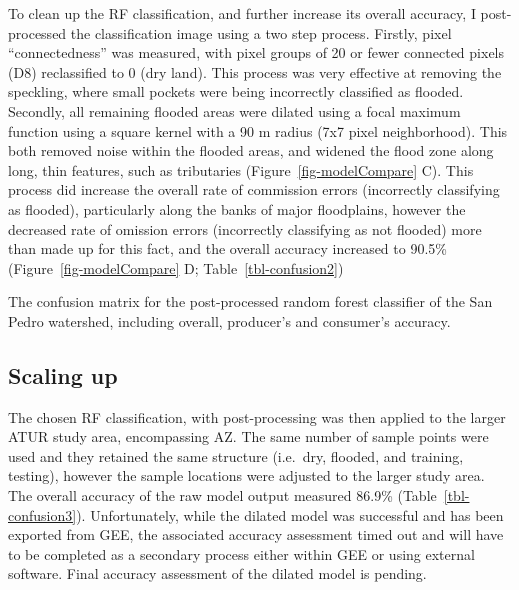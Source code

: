 \documentclass[
]{agujournal2019}
\begin{document}
To clean up the RF classification, and further increase its overall
accuracy, I post-processed the classification image using a two step
process. Firstly, pixel ``connectedness'' was measured, with pixel
groups of 20 or fewer connected pixels (D8) reclassified to 0 (dry
land). This process was very effective at removing the speckling, where
small pockets were being incorrectly classified as flooded. Secondly,
all remaining flooded areas were dilated using a focal maximum function
using a square kernel with a 90 m radius (7x7 pixel neighborhood). This
both removed noise within the flooded areas, and widened the flood zone
along long, thin features, such as tributaries
(Figure~\ref{fig-modelCompare} C). This process did increase the overall
rate of commission errors (incorrectly classifying as flooded),
particularly along the banks of major floodplains, however the decreased
rate of omission errors (incorrectly classifying as not flooded) more
than made up for this fact, and the overall accuracy increased to 90.5\%
(Figure~\ref{fig-modelCompare} D; Table~\ref{tbl-confusion2})

\begin{table}

\caption{\label{tbl-confusion2}The confusion matrix for the
post-processed random forest classifier of the San Pedro watershed,
including overall, producer's and consumer's accuracy.}


\end{table}%

\subsection{Scaling up}\label{scaling-up}

The chosen RF classification, with post-processing was then applied to
the larger ATUR study area, encompassing AZ. The same number of sample
points were used and they retained the same structure (i.e.~dry,
flooded, and training, testing), however the sample locations were
adjusted to the larger study area. The overall accuracy of the raw model
output measured 86.9\% (Table~\ref{tbl-confusion3}). Unfortunately,
while the dilated model was successful and has been exported from GEE,
the associated accuracy assessment timed out and will have to be
completed as a secondary process either within GEE or using external
software. Final accuracy assessment of the dilated model is pending.
\end{document}
